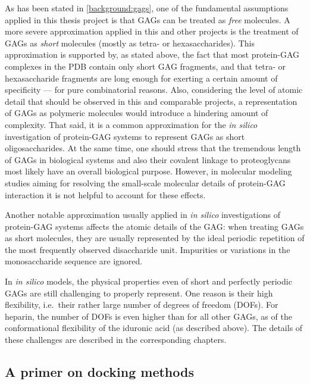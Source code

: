 As has been stated in \cref{background:gags}, one of the fundamental assumptions
applied in this thesis project is that GAGs can be treated as \textit{free}
molecules. A more severe approximation applied in this and other projects is the
treatment of GAGs as \textit{short} molecules (mostly as tetra- or
hexasaccharides). This approximation is supported by, as stated above, the fact
that most protein-GAG complexes in the PDB contain only short GAG fragments, and
that tetra- or hexasaccharide fragments are long enough for exerting a certain
amount of specificity --- for pure combinatorial reasons. Also, considering the
level of atomic detail that should be observed in this and comparable projects,
a representation of GAGs as polymeric molecules would introduce a hindering
amount of complexity. That said, it is a common approximation for the
\textit{in silico} investigation of protein-GAG systems to represent GAGs as
short oligosaccharides. At the same time, one should stress that the tremendous
length of GAGs in biological systems and also their covalent linkage to
proteoglycans most likely have an overall biological purpose. However, in
molecular modeling studies aiming for resolving the small-scale molecular
details of protein-GAG interaction it is not helpful to account for these
effects.

Another notable approximation usually applied in \textit{in silico}
investigations of protein-GAG systems affects the atomic details of the GAG:
when treating GAGs as short molecules, they are usually represented by the ideal
periodic repetition of the most frequently observed disaccharide unit.
Impurities or variations in the monosaccharide sequence are ignored.

In \textit{in silico} models, the physical properties even of short and
perfectly periodic GAGs are still challenging to properly represent. One reason
is their high flexibility, i.e.\ their rather large number of degrees of freedom
(DOFs). For heparin, the number of DOFs is even higher than for all other GAGs,
as of the conformational flexibility of the iduronic acid (as described above).
The details of these challenges are described in the corresponding chapters.

\subsection{A primer on docking methods}

